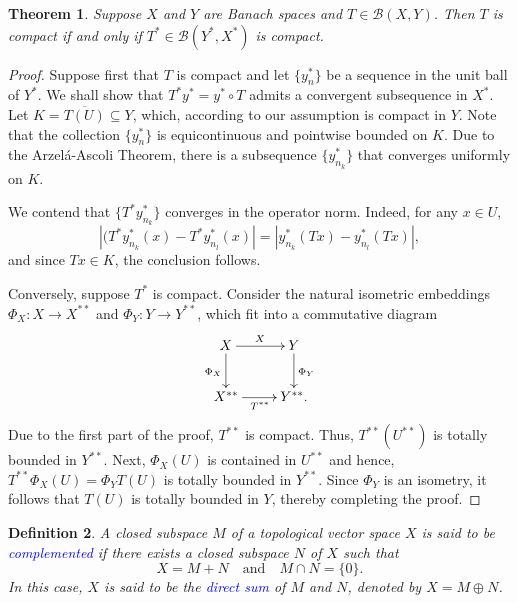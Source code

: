 \documentclass[11pt]{article}
\theoremstyle{thmstyle}
\newtheorem{theorem}{Theorem}[section]
\theoremstyle{defstyle}
\newtheorem{definition}[theorem]{Definition}
\newcommand{\scrB}{\mathscr B}
\newcommand{\define}[1]{\textcolor{blue}{\textit{#1}}}
\begin{document}
\begin{theorem}
    Suppose $X$ and $Y$ are Banach spaces and $T\in\scrB(X, Y)$. Then $T$ is compact if and only if $T^\ast\in\scrB(Y^\ast, X^\ast)$ is compact.
\end{theorem}
\begin{proof}
    Suppose first that $T$ is compact and let $\{y_n^\ast\}$ be a sequence in the unit ball of $Y^\ast$. We shall show that $T^\ast y^\ast = y^\ast\circ T$ admits a convergent subsequence in $X^\ast$. Let $K = \overline{T(U)}\subseteq Y$, which, according to our assumption is compact in $Y$. Note that the collection $\{y_n^\ast\}$ is equicontinuous and pointwise bounded on $K$. Due to the Arzel\'a-Ascoli Theorem, there is a subsequence $\{y_{n_k}^\ast\}$ that converges uniformly on $K$. 
    
    We contend that $\{T^\ast y_{n_k}^\ast\}$ converges in the operator norm. Indeed, for any $x\in U$, 
    \begin{equation*}
        |(T^\ast y_{n_k}^\ast(x) - T^\ast y_{n_l}^\ast(x)| = |y_{n_k}^\ast(Tx) - y_{n_l}^\ast(Tx)|,
    \end{equation*}
    and since $Tx\in K$, the conclusion follows.

    Conversely, suppose $T^\ast$ is compact. Consider the natural isometric embeddings $\Phi_X: X\to X^{\ast\ast}$ and $\Phi_Y: Y\to Y^{\ast\ast}$, which fit into a commutative diagram 
    \begin{align}
        \xymatrix {
            X\ar[r]^X\ar[d]_{\Phi_X} & Y\ar[d]^{\Phi_Y}\\
            X^{\ast\ast}\ar[r]_{T^{\ast\ast}} & Y^{\ast\ast}.
        }
    \end{align}
    Due to the first part of the proof, $T^{\ast\ast}$ is compact. Thus, $T^{\ast\ast}(U^{\ast\ast})$ is totally bounded in $Y^{\ast\ast}$. Next, $\Phi_X(U)$ is contained in $U^{\ast\ast}$ and hence, $T^{\ast\ast}\Phi_X(U) = \Phi_Y T(U)$ is totally bounded in $Y^{\ast\ast}$. Since $\Phi_Y$ is an isometry, it follows that $T(U)$ is totally bounded in $Y$, thereby completing the proof.
\end{proof}

\begin{definition}
    A closed subspace $M$ of a topological vector space $X$ is said to be \define{complemented} if there exists a closed subspace $N$ of $X$ such that 
    \begin{equation*}
        X = M + N\quad\text{and}\quad M\cap N = \{0\}.
    \end{equation*}
    In this case, $X$ is said to be the \define{direct sum} of $M$ and $N$, denoted by $X = M\oplus N$.
\end{definition}
\end{document}
